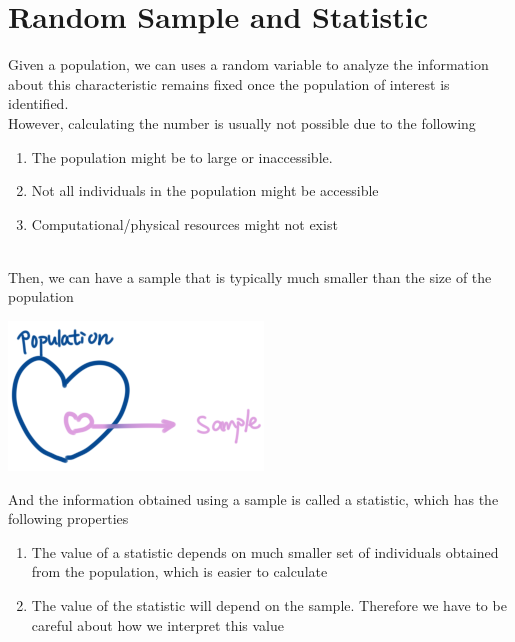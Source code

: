\documentclass[11pt,oneside]{book}
\theoremstyle{break}
\theoremstyle{break}
\begin{document}
\chapter[Random Sample and Statistic]{Random Sample and Statistic}
Given a population, we can uses a random variable to analyze the information about this characteristic remains fixed once the population of interest is identified.\\
However, calculating the number is usually not possible due to the following \\
 \begin{enumerate}[topsep=0pt,itemsep=-1ex,partopsep=1ex,parsep=1ex]
\item The population might be to large or inaccessible.
\item Not all individuals in the population might be accessible
\item Computational/physical resources might not exist
\end{enumerate}
\hfill\\
Then, we can have a sample that is typically much smaller than the size of the population\begin{center}
\includegraphics[scale=0.6]{figures/sample_popilation}
\end{center}
And the information obtained using a sample is called a statistic, which has the following properties \begin{enumerate}[topsep=0pt,itemsep=-1ex,partopsep=1ex,parsep=1ex]
\item The value of a statistic depends on much smaller set of individuals obtained from the population, which is easier to calculate
\item The value of the statistic will depend on the sample. Therefore we have to be careful about how we interpret this value 
\end{enumerate}
\hfill\\
\end{document}
